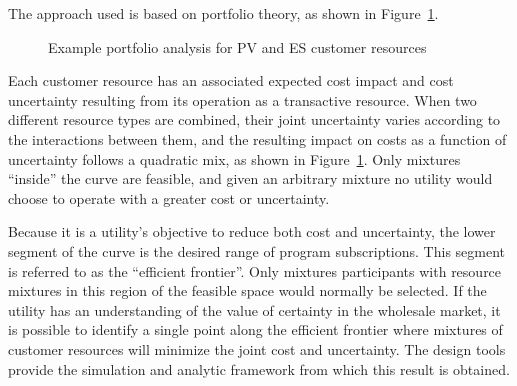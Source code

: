 \documentclass[10pt,twocolumn]{article}
\begin{document}
The approach used is based on portfolio theory, as shown in Figure~\ref{fig:portfolio}. 
\begin{figure}[!t]
    \centering
    \caption{Example portfolio analysis for PV and ES customer resources}
    \label{fig:portfolio}
\end{figure}
Each customer resource has an associated expected cost impact and cost uncertainty resulting from its operation as a transactive resource.  When two different resource types are combined, their joint uncertainty varies according to the interactions between them, and the resulting impact on costs as a function of uncertainty follows a quadratic mix, as shown in Figure~\ref{fig:portfolio}. Only mixtures ``inside'' the curve are feasible, and given an arbitrary mixture no utility would choose to operate with a greater cost or uncertainty.  

Because it is a utility's objective to reduce both cost and uncertainty, the lower segment of the curve is the desired range of program subscriptions. This segment is referred to as the ``efficient frontier''.  Only mixtures participants with resource mixtures in this region of the feasible space would normally be selected. If the utility has an understanding of the value of certainty in the wholesale market, it is possible to identify a single point along the efficient frontier where mixtures of customer resources will minimize the joint cost and uncertainty. The design tools provide the simulation and analytic framework from which this result is obtained.
\end{document}
